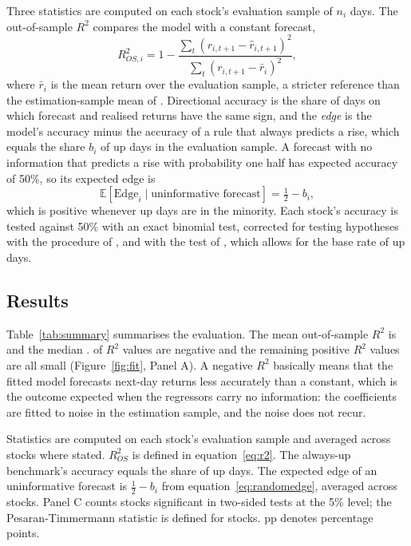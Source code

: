 \documentclass[11pt]{article}
\begin{document}
Three statistics are computed on each stock's evaluation sample of $n_i$ days. The
out-of-sample $R^2$ compares the model with a constant forecast,
\begin{equation}\label{eq:r2}
  R^2_{OS,i} = 1 - \frac{\sum_t \left(r_{i,t+1} - \hat r_{i,t+1}\right)^2}
                       {\sum_t \left(r_{i,t+1} - \bar r_i\right)^2},
\end{equation}
where $\bar r_i$ is the mean return over the evaluation sample, a stricter reference
than the estimation-sample mean of \citet{campbell2008}. Directional accuracy is the
share of days on which forecast and realised returns have the same sign, and the
\emph{edge} is the model's accuracy minus the accuracy of a rule that always predicts a rise,
which equals the share $b_i$ of up days in the evaluation sample. A forecast with no
information that predicts a rise with probability one half has expected accuracy of
50\%, so its expected edge is
\begin{equation}\label{eq:randomedge}
  \mathbb{E}\left[\mathrm{Edge}_i \mid \text{uninformative forecast}\right] = \tfrac12 - b_i ,
\end{equation}
which is positive whenever up days are in the minority. Each stock's accuracy is
tested against 50\% with an exact binomial test, corrected for testing \NStocks{}
hypotheses with the procedure of \citet{benjamini1995}, and with the test of
\citet{pesaran1992}, which allows for the base rate of up days.

\subsection{Results}

Table~\ref{tab:summary} summarises the evaluation. The mean out-of-sample $R^2$ is
\RsqMean{} and the median \RsqMedian. \NRsqNeg{} of \NStocks{} $R^2$ values are negative
and the remaining \NRsqPos{} positive $R^2$ values are all small (Figure~\ref{fig:fit}, Panel A). A
negative $R^2$ basically means that the fitted model forecasts next-day returns less
accurately than a constant, which is the outcome expected when the regressors carry
no information: the coefficients are fitted to noise in the estimation sample, and
the noise does not recur.

\begin{table}[!htbp]
\centering
\caption{Part I: Out-of-sample performance across \NStocks{} stocks}
\label{tab:summary}
\small

\begin{tablenote}
Statistics are computed on each stock's evaluation sample and averaged across
stocks where stated. $R^2_{OS}$ is defined in equation~\eqref{eq:r2}. The
always-up benchmark's accuracy equals the share of up days. The expected edge of an
uninformative forecast is $\tfrac12 - b_i$ from equation~\eqref{eq:randomedge},
averaged across stocks. Panel C counts stocks significant in two-sided tests at the
5\% level; the Pesaran-Timmermann statistic is defined for \NPTDefined{} stocks.
pp denotes percentage points.
\end{tablenote}
\end{table}
\end{document}
